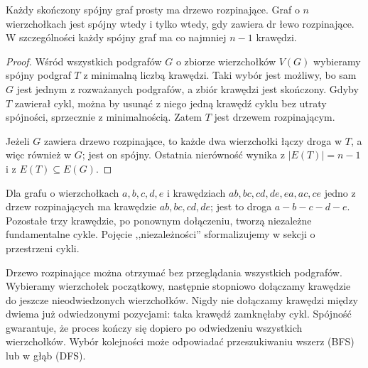 \begin{twierdzenie}
Każdy skończony spójny graf prosty ma drzewo
rozpinające. Graf o $n$ wierzchołkach jest
spójny wtedy i tylko wtedy, gdy zawiera
dr łewo rozpinające. W szczególności każdy
spójny graf ma co najmniej $n-1$ krawędzi.
\end{twierdzenie}

\begin{proof}
Wśród wszystkich podgrafów $G$ o zbiorze
wierzchołków $V(G)$ wybieramy spójny podgraf
$T$ z minimalną liczbą krawędzi. Taki wybór
jest możliwy, bo sam $G$ jest jednym z
rozważanych podgrafów, a zbiór krawędzi jest
skończony. Gdyby $T$ zawierał cykl, można
by usunąć z niego jedną krawędź cyklu
bez utraty spójności, sprzecznie z minimalnością.
Zatem $T$ jest drzewem rozpinającym.

Jeżeli $G$ zawiera drzewo rozpinające, to
każde dwa wierzchołki łączy droga w $T$, a więc
również w $G$; jest on spójny. Ostatnia
nierówność wynika z $|E(T)|=n-1$ i z
$E(T)\subseteq E(G)$.
\end{proof}

\begin{przyklad}
Dla grafu o wierzchołkach $a,b,c,d,e$ i krawędziach
$ab,bc,cd,de,ea,ac,ce$ jedno z drzew rozpinających
ma krawędzie $ab,bc,cd,de$; jest to droga
$a-b-c-d-e$. Pozostałe trzy krawędzie, po
ponownym dołączeniu, tworzą niezależne
fundamentalne cykle. Pojęcie ,,niezależności''
sformalizujemy w sekcji o przestrzeni cykli.
\end{przyklad}

\begin{center}
\end{center}

\begin{uwaga}
Drzewo rozpinające można otrzymać bez przeglądania
wszystkich podgrafów. Wybieramy wierzchołek
początkowy, następnie stopniowo dołączamy
krawędzie do jeszcze nieodwiedzonych wierzchołków.
Nigdy nie dołączamy krawędzi między dwiema
już odwiedzonymi pozycjami: taka krawędź
zamknęłaby cykl. Spójność gwarantuje, że
proces kończy się dopiero po odwiedzeniu
wszystkich wierzchołków. Wybór kolejności
może odpowiadać przeszukiwaniu wszerz (BFS)
lub w głąb (DFS).
\end{uwaga}


